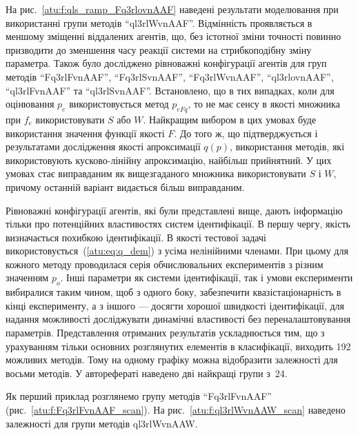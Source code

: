\documentclass[a4paper,13pt]{atuaref}
\begin{document}
На рис.~\ref{atu:f:qls_ramp_Fq3rlovnAAF} наведені результати моделювання при використанні групи методів
``ql3rlWvnAAF''.
Відмінність проявляється в меншому зміщенні віддалених агентів, що, без
істотної зміни точності повинно призводити до зменшення часу реакції системи на
стрибкоподібну зміну параметра.
Також було досліджено рівноважні конфігурації агентів для
груп методів
``Fq3rlFvnAAF'',
``Fq3rlSvnAAF'',
``Fq3rlWvnAAF'',
``ql3rlovnAAF'',
``ql3rlFvnAAF'' та
``ql3rlSvnAAF''.
Встановлено, що в тих випадках, коли для оцінювання $ p_e $ використовується
метод $ p_{eFq} $, то не має сенсу в якості множника при $ f_e $
використовувати $ S $ або $ W $. Найкращим вибором в цих умовах буде
використання значення функції якості $ F $. До того ж, що підтверджується і
результатами дослідження якості апроксимації $ q (p) $, використання методів,
які використовують кусково-лінійну апроксимацію, найбільш прийнятний. У цих
умовах стає виправданим як вищезгаданого множника використовувати
$ S $ і $ W$, причому останній варіант видається більш виправданим.


Рівноважні конфігурації агентів, які були представлені вище, дають інформацію тільки про
потенційних властивостях систем ідентифікації. В першу чергу, якість визначається
похибкою ідентифікації. В якості тестової задачі
використовується~(\ref{atu:eq:q_dem}) з усіма нелінійними членами. При цьому для кожного методу
проводилася серія обчислювальних експериментів з різним значенням $ p_o $. Інші
параметри як системи ідентифікації, так і умови експерименти вибиралися таким
чином, щоб з одного боку, забезпечити квазістаціонарність в кінці експерименту, а
з іншого --- досягти хорошої швидкості ідентифікації, для надання можливості
досліджувати динамічні властивості без переналаштовування параметрів.
Представлення отриманих результатів ускладнюється тим, що з урахуванням тільки
основних розглянутих елементів в класифікації, виходить 192 можливих методів.
Тому на одному графіку можна відобразити залежності для восьми методів.
У авторефераті наведено дві найкращі групи з~24.

Як перший приклад розглянемо групу методів
``Fq3rlFvnAAF'' (рис.~\ref{atu:f:Fq3rlFvnAAF_scan}).
На рис.~\ref{atu:f:ql3rlWvnAAW_scan} наведено залежності для групи методів ql3rlWvnAAW.
\end{document}
